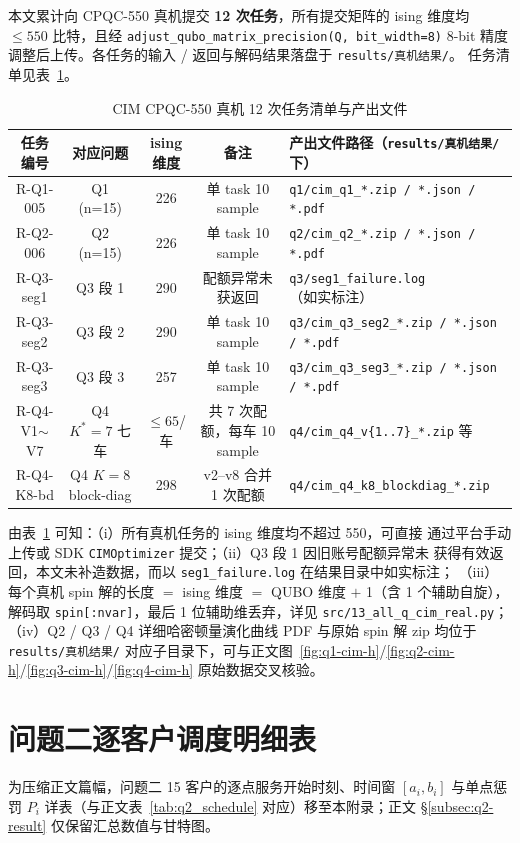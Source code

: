 \documentclass[UTF8,12pt,a4paper]{ctexart}
\begin{document}
本文累计向 CPQC-550 真机提交 \textbf{12 次任务}，所有提交矩阵的 ising 维度均
$\le 550$ 比特，且经 \texttt{adjust\_qubo\_matrix\_precision(Q, bit\_width=8)}
8-bit 精度调整后上传。各任务的输入 / 返回与解码结果落盘于 \texttt{results/真机结果/}。
任务清单见表~\ref{tab:cim-tasks}。

\begin{table}[H]
    \centering
    \caption{CIM CPQC-550 真机 12 次任务清单与产出文件}
    \label{tab:cim-tasks}
    \footnotesize
    \begin{tabular}{c c c c l}
        \toprule
        任务编号 & 对应问题 & ising 维度 & 备注 & 产出文件路径（\texttt{results/真机结果/}下） \\
        \midrule
        R-Q1-005 & Q1 (n=15)         & 226            & 单 task 10 sample & \texttt{q1/cim\_q1\_*.zip / *.json / *.pdf} \\
        R-Q2-006 & Q2 (n=15)         & 226            & 单 task 10 sample & \texttt{q2/cim\_q2\_*.zip / *.json / *.pdf} \\
        R-Q3-seg1 & Q3 段 1            & 290           & 配额异常未获返回    & \texttt{q3/seg1\_failure.log}（如实标注） \\
        R-Q3-seg2 & Q3 段 2            & 290           & 单 task 10 sample & \texttt{q3/cim\_q3\_seg2\_*.zip / *.json / *.pdf} \\
        R-Q3-seg3 & Q3 段 3            & 257           & 单 task 10 sample & \texttt{q3/cim\_q3\_seg3\_*.zip / *.json / *.pdf} \\
        R-Q4-V1$\sim$V7 & Q4 $K^{*}\!=\!7$ 七车 & $\le 65$/车 & 共 7 次配额，每车 10 sample & \texttt{q4/cim\_q4\_v\{1..7\}\_*.zip} 等 \\
        R-Q4-K8-bd & Q4 $K\!=\!8$ block-diag & 298 & v2--v8 合并 1 次配额    & \texttt{q4/cim\_q4\_k8\_blockdiag\_*.zip} \\
        \bottomrule
    \end{tabular}
\end{table}

由表~\ref{tab:cim-tasks} 可知：（i）所有真机任务的 ising 维度均不超过 550，可直接
通过平台手动上传或 SDK \texttt{CIMOptimizer} 提交；（ii）Q3 段 1 因旧账号配额异常未
获得有效返回，本文未补造数据，而以 \texttt{seg1\_failure.log} 在结果目录中如实标注；
（iii）每个真机 spin 解的长度 $=$ ising 维度 $=$ QUBO 维度 $+$ 1（含 1 个辅助自旋），
解码取 \texttt{spin[:nvar]}，最后 1 位辅助维丢弃，详见 \texttt{src/13\_all\_q\_cim\_real.py}；
（iv）Q2 / Q3 / Q4 详细哈密顿量演化曲线 PDF 与原始 spin 解 zip 均位于
\texttt{results/真机结果/} 对应子目录下，可与正文图~\ref{fig:q1-cim-h}/\ref{fig:q2-cim-h}/\ref{fig:q3-cim-h}/\ref{fig:q4-cim-h}
原始数据交叉核验。

\section{问题二逐客户调度明细表}
\label{app:q2-schedule}

为压缩正文篇幅，问题二 15 客户的逐点服务开始时刻、时间窗 $[a_i,b_i]$ 与单点惩罚
$P_i$ 详表（与正文表~\ref{tab:q2_schedule} 对应）移至本附录；正文 §\ref{subsec:q2-result}
仅保留汇总数值与甘特图。


\end{document}
